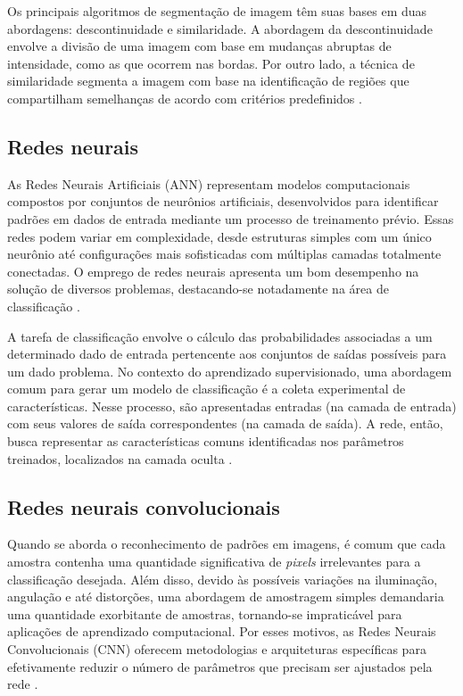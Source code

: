 Os principais algoritmos de segmentação de imagem têm suas bases em duas 
abordagens: descontinuidade e similaridade. A abordagem da descontinuidade 
envolve a divisão de uma imagem com base em mudanças abruptas de 
intensidade, como as que ocorrem nas bordas. Por outro lado, a técnica 
de similaridade segmenta a imagem com base na identificação de regiões 
que compartilham semelhanças de acordo com critérios 
predefinidos \cite{gonzalez2010}.

\subsection{Redes neurais}\label{subsec:redes}

As Redes Neurais Artificiais (ANN) representam modelos computacionais 
compostos por conjuntos de neurônios artificiais, desenvolvidos para 
identificar padrões em dados de entrada mediante um processo de treinamento 
prévio. Essas redes podem variar em complexidade, desde estruturas simples 
com um único neurônio até configurações mais sofisticadas com múltiplas 
camadas totalmente conectadas. O emprego de redes neurais apresenta um 
bom desempenho na solução de diversos problemas, destacando-se 
notadamente na área de classificação \cite{italo2021}.

A tarefa de classificação envolve o cálculo das probabilidades associadas 
a um determinado dado de entrada pertencente aos conjuntos de saídas 
possíveis para um dado problema. No contexto do aprendizado supervisionado, 
uma abordagem comum para gerar um modelo de classificação é a coleta 
experimental de características. Nesse processo, são apresentadas entradas 
(na camada de entrada) com seus valores de saída correspondentes 
(na camada de saída). A rede, então, busca representar as características 
comuns identificadas nos parâmetros treinados, localizados na camada 
oculta \cite{italo2021}.

\subsection{Redes neurais convolucionais}\label{subsec:convolucionais}

Quando se aborda o reconhecimento de padrões em imagens, é comum que cada 
amostra contenha uma quantidade significativa de \textit{pixels} irrelevantes para 
a classificação desejada. Além disso, devido às possíveis variações na 
iluminação, angulação e até distorções, uma abordagem de amostragem 
simples demandaria uma quantidade exorbitante de amostras, tornando-se 
impraticável para aplicações de aprendizado computacional. Por esses 
motivos, as Redes Neurais Convolucionais (CNN) oferecem metodologias 
e arquiteturas específicas para efetivamente reduzir o número de 
parâmetros que precisam ser ajustados pela rede \cite{italo2021}.

